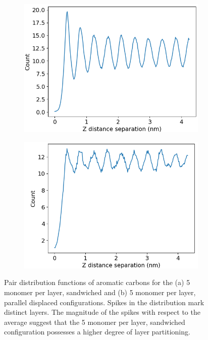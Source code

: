 \documentclass{article}
\begin{document}
  \begin{figure}[!ht]
	\centering
	\begin{subfigure}{0.45\textwidth}
		\centering
		\includegraphics[width=\textwidth]{zdf5layered.png}
		\caption{}\label{fig:zdf_layered}
	\end{subfigure}
	\begin{subfigure}{0.45\textwidth}
		\centering
		\includegraphics[width=\textwidth]{zdf5offset.png}
		\caption{}\label{fig:zdf_offset}
	\end{subfigure}
	\caption{Pair distribution functions of aromatic carbons for the
	(a) 5 monomer per layer, sandwiched and (b) 5 monomer per layer, 
	parallel displaced configurations. Spikes in the distribution mark
	distinct layers. The magnitude of the spikes with respect to the 
	average suggest that the 5 monomer per layer, sandwiched configuration
	possesses a higher degree of layer partitioning.}\label{fig:zdf}
  \end{figure}
\end{document}
